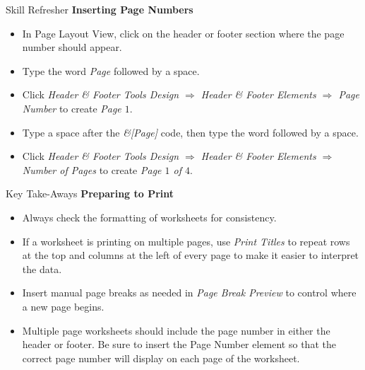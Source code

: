 \begin{center}
	\begin{sklbox}{Skill Refresher}
		\textbf{Inserting Page Numbers}
		\\
		\begin{itemize}
			\setlength{\itemsep}{0pt}
			\setlength{\parskip}{0pt}
			\setlength{\parsep}{0pt}

			\item In Page Layout View, click on the header or footer section where the page number should appear.
			\item Type the word \textit{Page} followed by a space.
			\item Click \textit{Header \& Footer Tools Design $ \Rightarrow $ Header \& Footer Elements $ \Rightarrow $ Page Number} to create \textit{Page $ 1 $}.
			\item Type a space after the \textit{\&[Page]} code, then type the word  followed by a space. 
			\item Click \textit{Header \& Footer Tools Design $ \Rightarrow $ Header \& Footer Elements $ \Rightarrow $ Number of Pages} to create \textit{Page $ 1 $ of $ 4 $}.
			
		\end{itemize}
	\end{sklbox}
\end{center}

\begin{center}
	\begin{tkwbox}{Key Take-Aways}
		\textbf{Preparing to Print}
		\\
		\begin{itemize}
			\setlength{\itemsep}{0pt}
			\setlength{\parskip}{0pt}
			\setlength{\parsep}{0pt}

			\item Always check the formatting of worksheets for consistency.
			\item If a worksheet is printing on multiple pages, use \textit{Print Titles} to repeat rows at the top and columns at the left of every page to make it easier to interpret the data.
			\item Insert manual page breaks as needed in \textit{Page Break Preview} to control where a new page begins.
			\item Multiple page worksheets should include the page number in either the header or footer. Be sure to insert the Page Number element so that the correct page number will display on each page of the worksheet.
			
		\end{itemize}
	\end{tkwbox}
\end{center}

